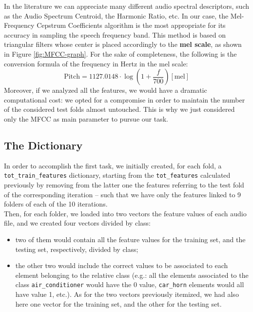 \documentclass[11pt]{article}
\begin{document}
In the literature we can appreciate many different audio spectral descriptors, such as the Audio Spectrum Centroid, the Harmonic Ratio, etc. In our case, the Mel-Frequency Cepstrum Coefficients algorithm is the most appropriate for its accuracy in sampling the speech frequency band. This method is based on triangular filters whose center is placed accordingly to the \textbf{mel scale}, as shown in Figure \ref{fig:MFCC-graph}. For the sake of completeness, the following is the conversion formula of the frequency in Hertz in the mel scale:
\begin{equation}
\mathrm{Pitch} = 1127.0148\cdot \log\displaystyle\left(1+\frac{f}{700}\right)\mathrm{[mel]}
\end{equation}
Moreover, if we analyzed all the features, we would have a dramatic computational cost: we opted for a compromise in order to maintain the number of the considered test folds almost untouched. This is why we just considered only the MFCC as main parameter to pursue our task.

\subsection{The Dictionary}
In order to accomplish the first task, we initially created, for each fold, a \texttt{tot{\_}train{\_}features} dictionary, starting from the \texttt{tot{\_}features} calculated previously by removing from the latter one the features referring to the test fold of the corresponding iteration -- such that we have only the features linked to 9 folders of each of the 10 iterations.\\
Then, for each folder, we loaded into two vectors the feature values of each audio file, and we created four vectors divided by class:
\begin{itemize}
\item two of them would contain all the feature values for the training set, and the testing set, respectively, divided by class;
\item the other two would include the correct values to be associated to each element belonging to the relative class (e.g.: all the elements associated to the class \texttt{air{\_}conditioner} would have the 0 value, \texttt{car{\_}horn} elements would all have value 1, etc.). As for the two vectors previously itemized, we had also here one vector for the training set, and the other for the testing set. 
\end{itemize}
\end{document}
